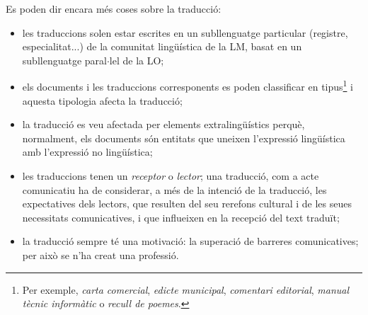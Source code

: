 Es poden dir encara més coses sobre la traducció:
\begin{itemize}
\item les traduccions solen estar escrites en un subllenguatge particular
(registre, especialitat...) de la comunitat lingüística de la LM, basat en un subllenguatge
paral$\cdot$lel de la LO;
\item els documents i les traduccions corresponents es poden classificar en
tipus\footnote{Per exemple, \emph{carta comercial}, \emph{edicte municipal},
  \emph{comentari editorial}, \emph{manual tècnic informàtic} o \emph{recull de poemes}. } i aquesta tipologia afecta la traducció;
\item la traducció es veu afectada per elements
extralingüístics perquè, normalment, els documents són
entitats que uneixen l'expressió lingüística amb
l'expressió no lingüística;
\item les traduccions tenen un \emph{receptor} o \emph{lector}; una 
traducció, com a acte comunicatiu ha de considerar, a  més de la
intenció de la traducció, les expectatives dels
lectors, que resulten del seu rerefons cultural i de les seues necessitats
comunicatives, i que influeixen en la recepció del text traduït;
\item la traducció sempre té una motivació: la superació de
barreres comunicatives; per això se n'ha creat una professió. 
\end{itemize}


